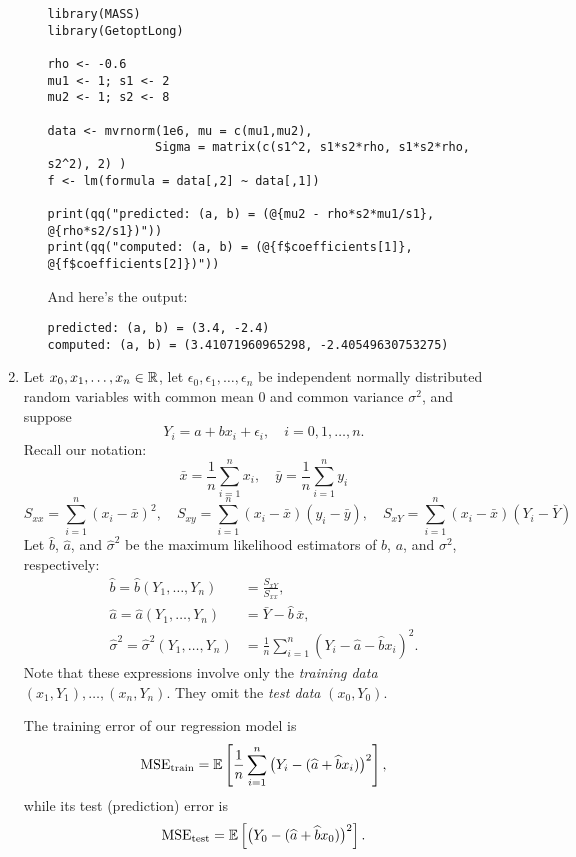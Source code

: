 \documentclass[12pt]{amsart}
\begin{document}
\begin{enumerate}
\begin{enumerate}
        \bigskip
        \begin{verbatim}
library(MASS)
library(GetoptLong)

rho <- -0.6
mu1 <- 1; s1 <- 2
mu2 <- 1; s2 <- 8

data <- mvrnorm(1e6, mu = c(mu1,mu2), 
               Sigma = matrix(c(s1^2, s1*s2*rho, s1*s2*rho, s2^2), 2) )
f <- lm(formula = data[,2] ~ data[,1])

print(qq("predicted: (a, b) = (@{mu2 - rho*s2*mu1/s1}, @{rho*s2/s1})"))
print(qq("computed: (a, b) = (@{f$coefficients[1]}, @{f$coefficients[2]})"))
        \end{verbatim}

        And here's the output:

        \bigskip
        \begin{verbatim}
predicted: (a, b) = (3.4, -2.4)
computed: (a, b) = (3.41071960965298, -2.40549630753275)
        \end{verbatim}


    \end{enumerate}

    \item Let $x_0,x_1,\ldots,x_n\in\mathbb{R}$, let $\epsilon_0,\epsilon_1,\ldots,\epsilon_n$ be independent 
    normally distributed random variables with common mean $0$ and common variance $\sigma^2$,
    and suppose
    \[
        Y_i = a + bx_i + \epsilon_i,\quad i=0,1,\ldots,n.
    \]
    Recall our notation:
    \[
        \bar x = \frac1n\sum_{i=1}^n x_i,\quad \bar y = \frac1n\sum_{i=1}^n y_i
    \]
    \[
        S_{xx} = \sum_{i=1}^n (x_i - \bar x)^2,\quad
        S_{xy} = \sum_{i=1}^n(x_i-\bar x)(y_i - \bar y),\quad
        S_{xY} = \sum_{i=1}^n(x_i-\bar x)(Y_i - \bar Y)
    \]
    Let $\hat b$, $\hat a$, and $\hat \sigma^2$ be the maximum likelihood estimators of
    $b$, $a$, and $\sigma^2$, respectively:
    \begin{align*}
        \hat{b}=\hat{b}(Y_1,\ldots,Y_n) &= \frac{S_{xY}}{S_{xx}},\\
        \hat{a}=\hat{a}(Y_1,\ldots,Y_n) &=   \bar Y - \hat b\, \bar x,\\
        \hat{\sigma}^2=\hat{\sigma}^2(Y_1,\ldots,Y_n)
        &= \frac 1 n\sum_{i=1}^n (Y_i - \hat a - \hat b x_i)^2.
    \end{align*}
    Note that these expressions involve only the \emph{training data} $(x_1,Y_1),\ldots,(x_n,Y_n)$.
    They omit the \emph{test data} $(x_0, Y_0)$.
    
    The training error of our regression model is
    \[
        \operatorname{MSE}_\text{train} = \operatorname{\mathbb{E}}\left[\frac1n\sum_{i=1}^n \big(Y_i -(\widehat a + \widehat b x_i)\big)^2\right],
    \]
    while its test (prediction) error is
    \[
        \operatorname{MSE}_{\text{test}} = \operatorname{\mathbb{E}}\left[\big(Y_0 - (\widehat a + \widehat b x_0)\big)^2\right].
    \]
    

\end{enumerate}
\end{document}
